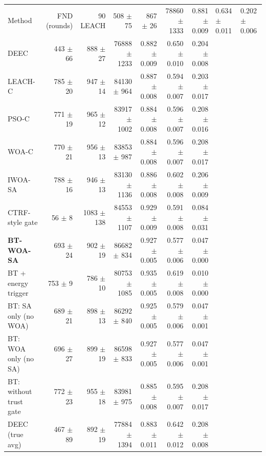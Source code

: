 \begin{tabular}{lrrrrrr}
\toprule
Method & FND (rounds) & 90 %
\midrule
LEACH & 508 $\pm$ 75 & 867 $\pm$ 26 & 78860 $\pm$ 1333 & 0.881 $\pm$ 0.009 & 0.634 $\pm$ 0.011 & 0.202 $\pm$ 0.006 \\
DEEC & 443 $\pm$ 66 & 888 $\pm$ 27 & 76888 $\pm$ 1233 & 0.882 $\pm$ 0.009 & 0.650 $\pm$ 0.010 & 0.204 $\pm$ 0.008 \\
LEACH-C & 785 $\pm$ 20 & 947 $\pm$ 14 & 84130 $\pm$ 964 & 0.887 $\pm$ 0.008 & 0.594 $\pm$ 0.007 & 0.203 $\pm$ 0.017 \\
PSO-C & 771 $\pm$ 19 & 965 $\pm$ 12 & 83917 $\pm$ 1002 & 0.884 $\pm$ 0.008 & 0.596 $\pm$ 0.007 & 0.208 $\pm$ 0.016 \\
WOA-C & 770 $\pm$ 21 & 956 $\pm$ 13 & 83853 $\pm$ 987 & 0.884 $\pm$ 0.008 & 0.596 $\pm$ 0.007 & 0.208 $\pm$ 0.017 \\
IWOA-SA & 788 $\pm$ 16 & 946 $\pm$ 13 & 83130 $\pm$ 1136 & 0.886 $\pm$ 0.008 & 0.602 $\pm$ 0.008 & 0.206 $\pm$ 0.009 \\
CTRF-style gate & 56 $\pm$ 8 & 1083 $\pm$ 138 & 84553 $\pm$ 1107 & 0.929 $\pm$ 0.009 & 0.591 $\pm$ 0.008 & 0.084 $\pm$ 0.031 \\
\textbf{BT-WOA-SA} & 693 $\pm$ 24 & 902 $\pm$ 19 & 86682 $\pm$ 834 & 0.927 $\pm$ 0.005 & 0.577 $\pm$ 0.006 & 0.047 $\pm$ 0.000 \\
BT + energy trigger & 753 $\pm$ 9 & 786 $\pm$ 10 & 80753 $\pm$ 1085 & 0.935 $\pm$ 0.005 & 0.619 $\pm$ 0.008 & 0.010 $\pm$ 0.000 \\
BT: SA only (no WOA) & 689 $\pm$ 21 & 898 $\pm$ 13 & 86292 $\pm$ 840 & 0.925 $\pm$ 0.005 & 0.579 $\pm$ 0.006 & 0.047 $\pm$ 0.001 \\
BT: WOA only (no SA) & 696 $\pm$ 27 & 899 $\pm$ 19 & 86598 $\pm$ 833 & 0.927 $\pm$ 0.005 & 0.577 $\pm$ 0.006 & 0.047 $\pm$ 0.001 \\
BT: without trust gate & 772 $\pm$ 23 & 955 $\pm$ 18 & 83981 $\pm$ 975 & 0.885 $\pm$ 0.008 & 0.595 $\pm$ 0.007 & 0.208 $\pm$ 0.017 \\
DEEC (true avg) & 467 $\pm$ 89 & 892 $\pm$ 19 & 77884 $\pm$ 1394 & 0.883 $\pm$ 0.011 & 0.642 $\pm$ 0.012 & 0.208 $\pm$ 0.008 \\
\bottomrule
\end{tabular}
